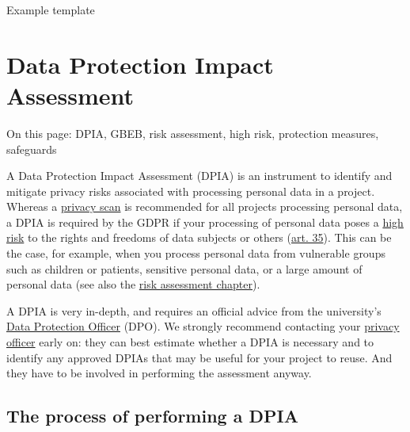 \documentclass[
]{book}
\begin{document}
Example template

\hypertarget{dpia}{%
\section{Data Protection Impact Assessment}\label{dpia}}

On this page: DPIA, GBEB, risk assessment, high risk, protection measures,
safeguards

A Data Protection Impact Assessment (DPIA) is an instrument to identify and
mitigate privacy risks associated with processing personal data in a project.
Whereas a \protect\hyperlink{privacy-scan}{privacy scan} is recommended for all projects
processing personal data, a DPIA is required by the GDPR if your processing of
personal data poses a \protect\hyperlink{high-risk-processing}{high risk} to the rights and
freedoms of data subjects or others
(\href{https://gdpr-info.eu/art-35-gdpr/}{art. 35}). This can be the
case, for example, when you process personal data from vulnerable groups such
as children or patients, sensitive personal data, or a large amount of personal
data (see also the \protect\hyperlink{risk-assessment}{risk assessment chapter}).

A DPIA is very in-depth, and requires an official advice from the university's
\href{https://intranet.uu.nl/en/knowledgebase/data-protection-officer}{Data Protection Officer}
(DPO). We strongly recommend contacting your \protect\hyperlink{support}{privacy officer}
early on: they can best estimate whether a DPIA is necessary and to identify
any approved DPIAs that may be useful for your project to reuse. And they have
to be involved in performing the assessment anyway.

\hypertarget{dpia-process}{%
\subsection{The process of performing a DPIA}\label{dpia-process}}
\end{document}
